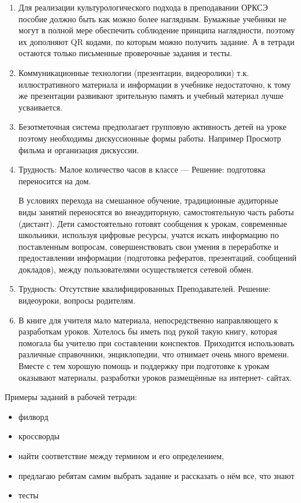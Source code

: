 \begin{enumerate}
\item Для реализации культурологического подхода в преподавании ОРКСЭ пособие должно быть как можно более наглядным. Бумажные учебники не могут в полной мере обеспечить соблюдение принципа наглядности, поэтому их дополняют QR кодами, по которым можно получить задание. А в тетради остаются только письменные проверочные задания и тесты.

\item Коммуникационные технологии (презентации, видеоролики) т.к. иллюстративного материала и информации в учебнике недостаточно, к тому же презентации развивают зрительную память и учебный материал лучше усваивается.

\item Безотметочная система предполагает групповую активность детей на уроке поэтому необходимы дискуссионные формы работы. Например Просмотр фильма и организация дискуссии.

\item Трудность: Малое количество часов в классе ---  Решение: подготовка переносится на дом. 

В условиях перехода на смешанное обучение, традиционные аудиторные виды занятий переносятся во внеаудиторную, самостоятельную часть работы (дистант). Дети самостоятельно готовят сообщения к урокам, современные школьники, используя цифровые ресурсы, учатся искать информацию по поставленным вопросам, совершенствовать свои умения в переработке и предоставлении информации (подготовка рефератов, презентаций, сообщений докладов), между пользователями осуществляется сетевой обмен\cite{shevardina}. 

\item Трудность: Отсутствие квалифицированных Преподавателей. 
Решение: видеоуроки, вопросы  родителям.

\item В книге для учителя мало материала, непосредственно направляющего к разработкам уроков. Хотелось  бы иметь под рукой такую книгу, которая помогала бы учителю при составлении конспектов. Приходится использовать различные справочники, энциклопедии, что отнимает очень много времени. Вместе с тем хорошую помощь и поддержку при подготовке к урокам оказывают материалы, разработки  уроков размещённые  на интернет- сайтах. 

\end{enumerate}

Примеры заданий в рабочей тетради:
\begin{itemize}
\item филворд
\item кроссворды
\item найти соответствие между термином и его определением,
\item предлагаю ребятам самим выбрать задание и рассказать о нём все, что знают
\item тесты
\end{itemize}

